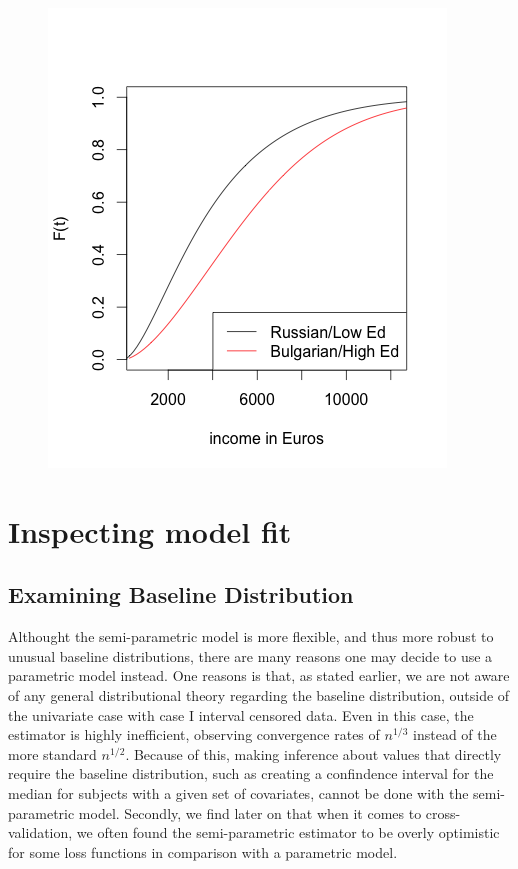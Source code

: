 \documentclass[11pt]{report}
\begin{document}
  \begin{figure}
  \includegraphics{essIncCDF_par.png}
  \label{figure:RusvBulg_par}
  \end{figure}

\chapter{Inspecting model fit}

  \section{Examining Baseline Distribution}
  
  Althought the semi-parametric model is more flexible, and thus more robust to unusual 
  baseline distributions, there are many reasons one may decide to use a parametric model
  instead. One reasons is that, as stated earlier, we are not aware of any general distributional
  theory regarding the baseline distribution, outside of the univariate case with case I 
  interval censored data. Even in this case, the estimator is highly inefficient, observing
  convergence rates of $n^{1/3}$ instead of the more standard $n^{1/2}$. Because of this,
  making inference about values that directly require the baseline distribution, such
  as creating a confindence interval for the median for subjects with a given set of 
  covariates, cannot be done with the semi-parametric model. Secondly, we find later
  on that when it comes to cross-validation, we often found the semi-parametric estimator
  to be overly optimistic for some loss functions in comparison with a parametric model. 
  
\end{document}
